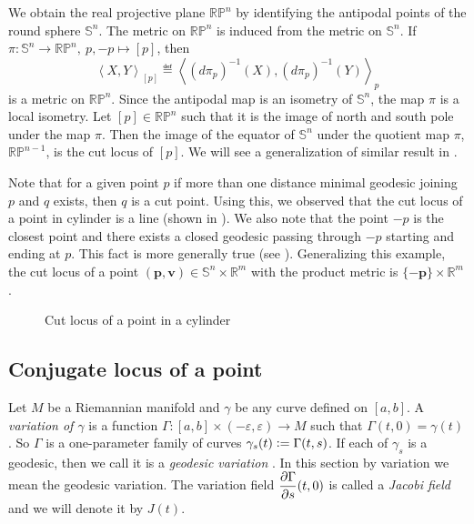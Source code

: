 \begin{eg}\label{eg:CutLocusofPointRPn}
    We obtain the real projective plane $\mathbb{RP}^n$ by identifying the antipodal points of the round sphere $\mathbb{S}^n$. The metric on $\mathbb{RP}^n$ is induced from the metric on $\mathbb{S}^n$. If $\pi:\mathbb{S}^n\to \mathbb{RP}^n,~p,-p\mapsto [p]$, then 
    \begin{displaymath}
         \left\langle X,Y \right\rangle_{[p]}\eqdef \left\langle \left(d\pi_p\right)^{-1}(X),\left(d\pi_p\right)^{-1}(Y) \right\rangle_p
    \end{displaymath}
    is a metric on $\mathbb{RP}^n$. Since the antipodal map is an isometry of $\mathbb{S}^n$, the map $\pi$ is a local isometry. Let $[p]\in \mathbb{RP}^n$ such that it is the image of north and south pole under the map $\pi$. Then the image of the equator of $\mathbb{S}^n$ under the quotient map $\pi$, $\mathbb{RP}^{n-1}$, is the cut locus of $[p]$. We will see a generalization of similar result in .
\end{eg}

\begin{eg}
    Note that for a given point $p$ if more than one distance minimal geodesic joining $p$ and $q$ exists, then $q$ is a cut point. Using this, we observed that the cut locus of a point in cylinder is a line (shown in ). We also note that the point $-p$ is the closest point and there exists a closed geodesic passing through $-p$ starting and ending at $p$. This fact is more generally true (see ).  Generalizing this example, the cut locus of a point $(\mathbf{p},\mathbf{v})\in\mathbb{S}^n\times \mathbb{R}^m$ with the product metric is $\{-\mathbf{p}\}\times \mathbb{R}^m$.
    \begin{figure}[H]
        \centering
        \caption{Cut locus of a point in a cylinder\label{fig:Example-Cylinder-CutLocusPoint}}
    \end{figure}
    
\end{eg}

\subsection{Conjugate locus of a point}
\hfb Let $M$ be a Riemannian manifold and $\gamma$ be any curve defined on $[a,b]$. A \textit{variation of $\gamma$} is a function $\Gamma:[a,b]\times (-\varepsilon,\varepsilon)\to M$ such that $\Gamma(t,0)=\gamma(t)$. So $\Gamma$ is a one-parameter family of curves $\gamma_s(t)\vcentcolon= \Gamma(t,s)$. If each of $\gamma_s$ is a geodesic, then we call it is a \textit{geodesic variation} . In this section by variation we mean the geodesic variation. The variation field $\dfrac{\partial\Gamma}{\partial s}(t,0)$ is called a \textit{Jacobi field} and we will denote it by $J(t)$.

